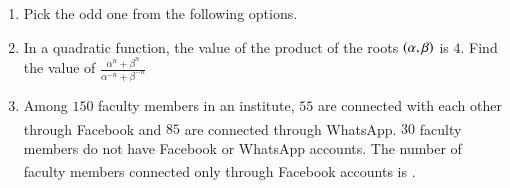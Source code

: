 \documentclass[journal,12pt,onecolumn]{IEEEtran}
\theoremstyle{remark}
\begin{document}
\begin{enumerate}[start=1, label=Q.\arabic*]
    \item Pick the odd one from the following options.
    \begin{enumerate}
    \end{enumerate}

    \hfill{}

    \item In a quadratic function, the value of the product of the roots $\left(\alpha, \beta\right)$ is $4$. Find the value of $\frac{\alpha^{n}+\beta^{n}}{\alpha^{-n}+\beta^{-n}}$
    \begin{enumerate}
    \end{enumerate}

    \hfill{}

    \item Among $150$ faculty members in an institute, $55$ are connected with each other through Facebook\textsuperscript{\textregistered} and $85$ are connected through WhatsApp. $30$ faculty members do not have Facebook or WhatsApp accounts. The number of faculty members connected only through Facebook\textsuperscript{\textregistered} accounts is \underline{\hspace{2cm}}.
    \begin{enumerate}
    \end{enumerate}

    \hfill{}


\end{enumerate}
\end{document}
